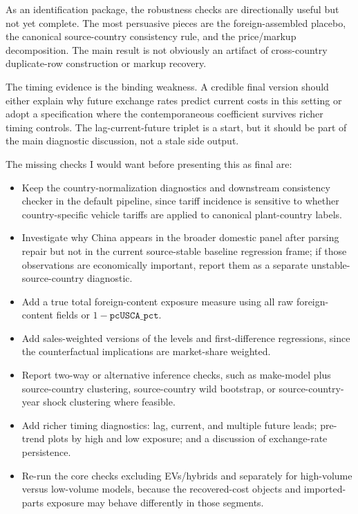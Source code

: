\documentclass[11pt]{article}
\begin{document}
As an identification package, the robustness checks are directionally useful but not yet complete. The most persuasive pieces are the foreign-assembled placebo, the canonical source-country consistency rule, and the price/markup decomposition. The main result is not obviously an artifact of cross-country duplicate-row construction or markup recovery.

The timing evidence is the binding weakness. A credible final version should either explain why future exchange rates predict current costs in this setting or adopt a specification where the contemporaneous coefficient survives richer timing controls. The lag-current-future triplet is a start, but it should be part of the main diagnostic discussion, not a stale side output.

The missing checks I would want before presenting this as final are:
\begin{itemize}
  \item Keep the country-normalization diagnostics and downstream consistency checker in the default pipeline, since tariff incidence is sensitive to whether country-specific vehicle tariffs are applied to canonical plant-country labels.
  \item Investigate why China appears in the broader domestic panel after parsing repair but not in the current source-stable baseline regression frame; if those observations are economically important, report them as a separate unstable-source-country diagnostic.
  \item Add a true total foreign-content exposure measure using all raw foreign-content fields or \(1-\texttt{pcUSCA\_pct}\).
  \item Add sales-weighted versions of the levels and first-difference regressions, since the counterfactual implications are market-share weighted.
  \item Report two-way or alternative inference checks, such as make-model plus source-country clustering, source-country wild bootstrap, or source-country-year shock clustering where feasible.
  \item Add richer timing diagnostics: lag, current, and multiple future leads; pre-trend plots by high and low exposure; and a discussion of exchange-rate persistence.
  \item Re-run the core checks excluding EVs/hybrids and separately for high-volume versus low-volume models, because the recovered-cost objects and imported-parts exposure may behave differently in those segments.
\end{itemize}
\end{document}
